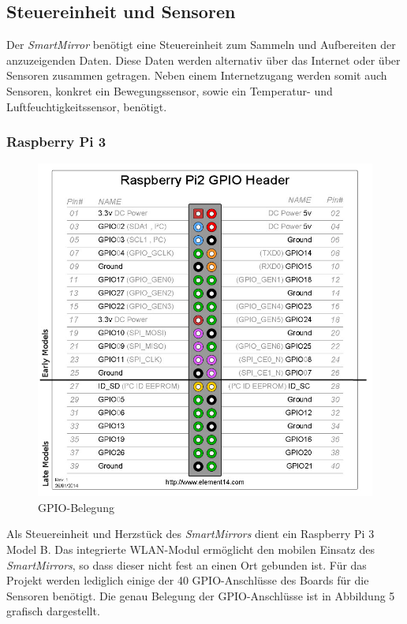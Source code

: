 \subsection{Steuereinheit und Sensoren}
Der \textit{SmartMirror} benötigt eine Steuereinheit zum Sammeln und Aufbereiten der anzuzeigenden Daten. Diese Daten werden alternativ über das Internet oder über Sensoren zusammen getragen. Neben einem Internetzugang werden somit auch Sensoren, konkret ein Bewegungssensor, sowie ein Temperatur- und Luftfeuchtigkeitssensor, benötigt.

\subsubsection*{Raspberry Pi 3}
\begin{figure}[H]
	\includegraphics[scale=0.4]{bilder/gpio_pinout.jpg}
	\caption{GPIO-Belegung}
\end{figure}
Als Steuereinheit und Herzstück des \textit{SmartMirrors} dient ein Raspberry Pi 3 Model B. Das integrierte WLAN-Modul ermöglicht den mobilen Einsatz des \textit{SmartMirrors}, so dass dieser nicht fest an einen Ort gebunden ist. Für das Projekt werden lediglich einige der 40 GPIO-Anschlüsse des Boards für die Sensoren benötigt. Die genau Belegung der GPIO-Anschlüsse ist in Abbildung 5 grafisch dargestellt.


